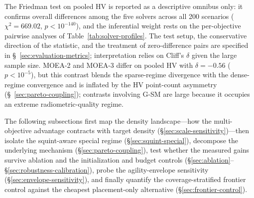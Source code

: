 \documentclass[preprint,12pt,authoryear]{elsarticle}
\begin{document}
The Friedman test on pooled HV is reported as a descriptive omnibus only:
it confirms overall differences among the five
solvers across all 200 scenarios ($\chi^2=669.02$, $p<10^{-140}$), and the
inferential weight rests on the per-objective pairwise analyses of
Table~\ref{tab:solver-profiles}. The test setup, the conservative direction
of the statistic, and the treatment of zero-difference pairs are specified in
\S~\ref{sec:evaluation-metrics}; interpretation
relies on Cliff's $\delta$ given the large sample size.
MOEA-2 and MOEA-3 differ on pooled HV with $\delta = -0.56$
($p < 10^{-5}$), but this contrast blends the sparse-regime divergence with
the dense-regime convergence and is inflated by the HV point-count
asymmetry (\S~\ref{sec:pareto-coupling}); contrasts involving
G-SM are large because it occupies an extreme radiometric-quality regime.

The following subsections first map the density landscape---how the
multi-objective advantage contracts with target density
(\S\ref{sec:scale-sensitivity})---then isolate the squint-aware special
regime (\S\ref{sec:squint-special}), decompose the underlying mechanism
(\S\ref{sec:pareto-coupling}), test whether the measured gains survive
ablation and the initialization and budget controls
(\S\ref{sec:ablation}--\S\ref{sec:robustness-calibration}),
probe the agility-envelope sensitivity (\S\ref{sec:envelope-sensitivity}),
and finally quantify the coverage-stratified frontier control against the
cheapest placement-only alternative (\S\ref{sec:frontier-control}).

\end{document}
